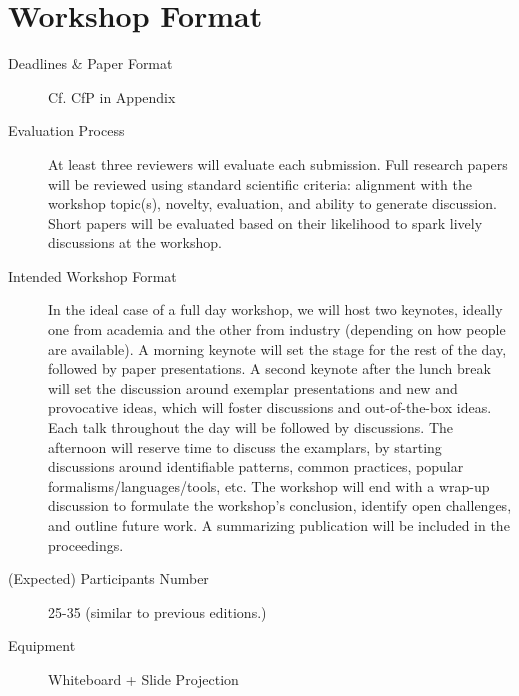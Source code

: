 \section{Workshop Format}
\label{sec:Format}

\begin{description}
   \item[Deadlines \& Paper Format] Cf. CfP in Appendix
   
   \item[Evaluation Process] At least three reviewers will evaluate each submission.
   Full research papers will be reviewed using standard scientific criteria: alignment 
   with the workshop topic(s), novelty, evaluation, and ability to generate discussion.
   Short papers will be evaluated based on their likelihood to spark lively 
   discussions at the workshop.

   \item[Intended Workshop Format] In the ideal case of a full day workshop, we 
   will host two keynotes, ideally one from academia and the other from industry
   (depending on how people are available). 
   A morning keynote will set the stage for the rest of the day, followed by 
   paper presentations. A second keynote after the lunch break will set the 
   discussion around exemplar presentations and new and provocative ideas,
   which will foster discussions and out-of-the-box ideas. Each talk throughout the
   day will be followed by discussions.
   The afternoon will reserve time to discuss the examplars, by starting discussions
   around identifiable patterns, common practices, popular formalisms/languages/tools, etc. 
   The workshop will end with a wrap-up discussion to formulate the workshop's 
   conclusion, identify open challenges, and outline future work.
   A summarizing publication will be included in the proceedings.
   
   \item[(Expected) Participants Number] 25-35 (similar to previous editions.)
   
   \item[Equipment] Whiteboard + Slide Projection
\end{description}

